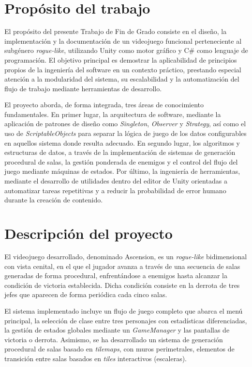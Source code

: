 \section{Propósito del trabajo}

El propósito del presente Trabajo de Fin de Grado consiste en el diseño, la implementación y la documentación de un videojuego funcional perteneciente al subgénero \textit{rogue-like}, utilizando Unity como motor gráfico \cite{REF_UNITY} y C\# como lenguaje de programación. El objetivo principal es demostrar la aplicabilidad de principios propios de la ingeniería del software en un contexto práctico, prestando especial atención a la modularidad del sistema, su escalabilidad y la automatización del flujo de trabajo mediante herramientas de desarrollo.

El proyecto aborda, de forma integrada, tres áreas de conocimiento fundamentales. En primer lugar, la arquitectura de software, mediante la aplicación de patrones de diseño como \textit{Singleton}, \textit{Observer} y \textit{Strategy}, así como el uso de \textit{ScriptableObjects} para separar la lógica de juego de los datos configurables en aquellos sistema donde resulta adecuado. En segundo lugar, los algoritmos y estructuras de datos, a través de la implementación de sistemas de generación procedural de salas, la gestión ponderada de enemigos y el control del flujo del juego mediante máquinas de estados. Por último, la ingeniería de herramientas, mediante el desarrollo de utilidades dentro del editor de Unity orientadas a automatizar tareas repetitivas y a reducir la probabilidad de error humano durante la creación de contenido.

\section{Descripción del proyecto}

El videojuego desarrollado, denominado Ascension, es un \textit{rogue-like} bidimensional con vista cenital, en el que el jugador avanza a través de una secuencia de salas generadas de forma procedural, enfrentándose a enemigos hasta alcanzar la condición de victoria establecida. Dicha condición consiste en la derrota de tres jefes que aparecen de forma periódica cada cinco salas.

El sistema implementado incluye un flujo de juego completo que abarca el menú principal, la selección de clase entre tres personajes con estadísticas diferenciadas, la gestión de estados globales mediante un \textit{GameManager} y las pantallas de victoria o derrota. Asimismo, se ha desarrollado un sistema de generación procedural de salas basado en \textit{tilemaps}, con muros perimetrales, elementos de transición entre salas basados en \textit{tiles} interactivos (escaleras).

